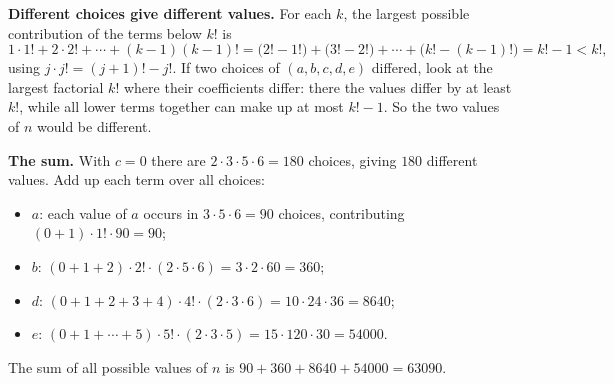 \textbf{Different choices give different values.} For each $k$, the largest possible contribution of the terms below $k!$ is
\[1\cdot1!+2\cdot2!+\cdots+(k-1)(k-1)!=\bigl(2!-1!\bigr)+\bigl(3!-2!\bigr)+\cdots+\bigl(k!-(k-1)!\bigr)=k!-1<k!,\]
using $j\cdot j!=(j+1)!-j!$. If two choices of $(a,b,c,d,e)$ differed, look at the largest factorial $k!$ where their coefficients differ: there the values differ by at least $k!$, while all lower terms together can make up at most $k!-1$. So the two values of $n$ would be different.

\textbf{The sum.} With $c=0$ there are $2\cdot3\cdot5\cdot6=180$ choices, giving $180$ different values. Add up each term over all choices:
\begin{itemize}
\item $a$: each value of $a$ occurs in $3\cdot5\cdot6=90$ choices, contributing $(0+1)\cdot1!\cdot90=90$;
\item $b$: $(0+1+2)\cdot2!\cdot(2\cdot5\cdot6)=3\cdot2\cdot60=360$;
\item $d$: $(0+1+2+3+4)\cdot4!\cdot(2\cdot3\cdot6)=10\cdot24\cdot36=8640$;
\item $e$: $(0+1+\cdots+5)\cdot5!\cdot(2\cdot3\cdot5)=15\cdot120\cdot30=54000$.
\end{itemize}
The sum of all possible values of $n$ is $90+360+8640+54000=\boxed{63090}$.
